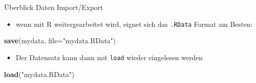 \documentclass[ignorenonframetext,]{beamer}
\newenvironment{Shaded}{}{}
\newcommand{\KeywordTok}[1]{\textcolor[rgb]{0.00,0.44,0.13}{\textbf{{#1}}}}
\newcommand{\DataTypeTok}[1]{\textcolor[rgb]{0.56,0.13,0.00}{{#1}}}
\newcommand{\StringTok}[1]{\textcolor[rgb]{0.25,0.44,0.63}{{#1}}}
\newcommand{\NormalTok}[1]{{#1}}
\providecommand{\tightlist}{%
\setlength{\itemsep}{0pt}\setlength{\parskip}{0pt}}
\begin{document}
\begin{frame}[fragile]{Überblick Daten Import/Export}

\begin{itemize}
\tightlist
\item
  wenn mit R weitergearbeitet wird, eignet sich das \texttt{.RData}
  Format am Besten:
\end{itemize}

\begin{Shaded}
\begin{Highlighting}[]
\KeywordTok{save}\NormalTok{(mydata, }\DataTypeTok{file=}\StringTok{"mydata.RData"}\NormalTok{)}
\end{Highlighting}
\end{Shaded}

\begin{itemize}
\tightlist
\item
  Der Datensatz kann dann mit \texttt{load} wieder eingelesen werden
\end{itemize}

\begin{Shaded}
\begin{Highlighting}[]
\KeywordTok{load}\NormalTok{(}\StringTok{"mydata.RData"}\NormalTok{)}
\end{Highlighting}
\end{Shaded}

\end{frame}
\end{document}
